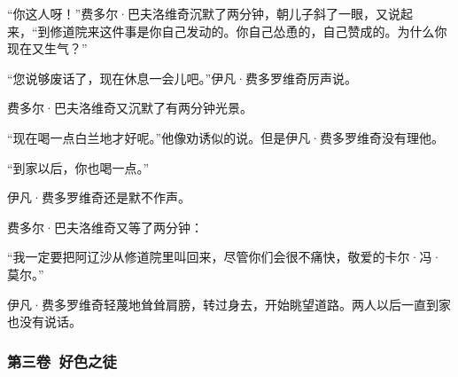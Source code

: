 \par “你这人呀！”费多尔·巴夫洛维奇沉默了两分钟，朝儿子斜了一眼，又说起来，“到修道院来这件事是你自己发动的。你自己怂恿的，自己赞成的。为什么你现在又生气？”
\par “您说够废话了，现在休息一会儿吧。”伊凡·费多罗维奇厉声说。
\par 费多尔·巴夫洛维奇又沉默了有两分钟光景。
\par “现在喝一点白兰地才好呢。”他像劝诱似的说。但是伊凡·费多罗维奇没有理他。
\par “到家以后，你也喝一点。”
\par 伊凡·费多罗维奇还是默不作声。
\par 费多尔·巴夫洛维奇又等了两分钟：
\par “我一定要把阿辽沙从修道院里叫回来，尽管你们会很不痛快，敬爱的卡尔·冯·莫尔。”
\par 伊凡·费多罗维奇轻蔑地耸耸肩膀，转过身去，开始眺望道路。两人以后一直到家也没有说话。











\subsubsection*{第三卷\ 好色之徒}




